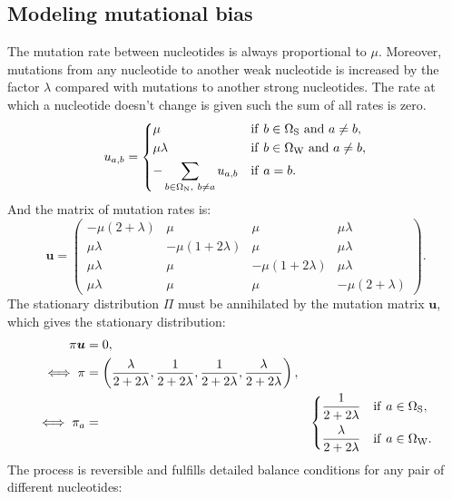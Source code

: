 \subsection{Modeling mutational bias}
\label{sec:mutBias}
The mutation rate between nucleotides is always proportional to $\mu$. Moreover, mutations from any nucleotide to another weak nucleotide is increased by the factor $\lambda$ compared with mutations to another strong nucleotides. The rate at which a nucleotide doesn't change is given such the sum of all rates is zero.
\begin{equation}
\label{nucRates}
u_{a, b} =
\begin{dcases}
\mu
& \mathrm{if} \ b \in \Omega_{\mathrm{S}} \ \mathrm{ and } \ a \neq b, \\
\mu \lambda
& \mathrm{if} \ b \in  \Omega_{\mathrm{W}} \ \mathrm{ and } \ a \neq b,  \\
- \sum_{b \in \Omega_{\mathrm{N}}, \ b \neq a }  u_{a, b}
& \mathrm{if} \ a = b.
\end{dcases}
\end{equation}
And the matrix of mutation rates is:
\begin{equation}
\label{nucMatrix}
\bm{u} =
\begin{pmatrix}
{-\mu(2 + \lambda)} & {\mu} & {\mu} & {\mu \lambda} \\
{\mu \lambda} & {-\mu(1 + 2\lambda)} & {\mu} & {\mu \lambda} \\
{\mu \lambda} & {\mu} & {-\mu(1 + 2\lambda)} & {\mu \lambda} \\
{\mu \lambda} & {\mu} & {\mu} & {-\mu(2 + \lambda)}
\end{pmatrix}.
\end{equation}
The stationary distribution $\Pi$ must be annihilated by the mutation matrix $\bm{u}$, which gives the stationary distribution:
\begin{align}
\pi \bm{u}
& =0, \\
\iff \pi
& =\left( \dfrac{\lambda}{2+2\lambda}, \dfrac{1}{2+2\lambda}, \dfrac{1}{2+2\lambda}, \dfrac{\lambda}{2+2\lambda} \right), \\
\iff \pi_a
& = &
\begin{dcases}
\dfrac{1}{2+2\lambda} & \mathrm{if} \ a \in \Omega_{\mathrm{S}}, \\
\dfrac{\lambda}{2+2\lambda} & \mathrm{if} \ a \in  \Omega_{\mathrm{W}}.  \\
\end{dcases}
\label{nucStationarity}
\end{align}
The process is reversible and fulfills detailed balance conditions for any pair of different nucleotides:
